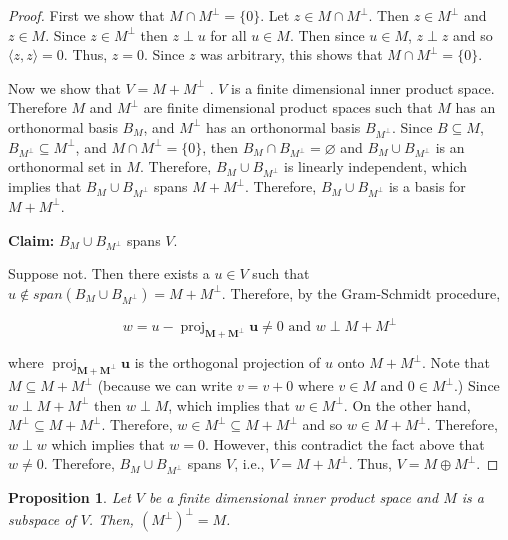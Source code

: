 \documentclass[12pt]{article}
\DeclareMathOperator{\proj}{proj}
\newcommand{\vct}{\mathbf}
\newcommand{\vctproj}[2][]{\proj_{\vct{#1}}\vct{#2}}
\newtheorem*{proposition}{Proposition}
\theoremstyle{definition}
\begin{document}
\begin{proof}
First we show that $M \cap M^{\perp} = \{ 0 \}$. Let $z \in M \cap M^{\perp}$. Then 
$z \in M^{\perp}$ and $z \in M$. Since $z \in M^{\perp}$ then $z \perp u$ for all
$u \in M$. Then since $u \in M$, $z \perp z$ and so $\langle z, z \rangle = 0$. Thus,
$z = 0$. Since $z$ was arbitrary, this shows that $M \cap M^{\perp} = \{ 0 \}$.

Now we show that $V = M + M^{\perp}$ . $V$ is a finite dimensional inner product space.
Therefore $M$ and $M^{\perp}$ are finite dimensional product spaces such that $M$ has
an orthonormal basis $B_M$, and $M^{\perp}$ has an orthonormal basis $B_{M^{\perp}}$.
Since $B \subseteq M$, $B_{M^{\perp}} \subseteq M^{\perp}$, and
$M \cap M^{\perp} = \{ 0 \}$, then $B_M \cap B_{M^{\perp}} = \varnothing$ and
$B_M \cup B_{M^{\perp}}$ is an orthonormal set in $M$. Therefore, $B_M \cup B_{M^{\perp}}$
is linearly independent, which implies that $B_M \cup B_{M^{\perp}}$ spans $M + M^{\perp}$.
Therefore, $B_M \cup B_{M^{\perp}}$ is a basis for $M + M^{\perp}$.

\textbf{Claim:} $B_M \cup B_{M^{\perp}}$ spans $V$.

Suppose not. Then there exists a $u \in V$ such that $u \notin span(B_M \cup B_{M^{\perp}}) =
M + M^{\perp}$. Therefore, by the Gram-Schmidt procedure,

\[
w = u - \vctproj[M + M^{\perp}]{u} \neq 0
\text{ and }
w \perp M + M^{\perp}\]

where $\vctproj[M + M^{\perp}]{u}$ is the orthogonal projection of $u$ onto $M + M^{\perp}$.
Note that $M \subseteq M + M^{\perp}$ (because we can write $v = v + 0$ where $v \in M$ and
$0 \in M^{\perp}$.) Since $w \perp M + M^{\perp}$ then $w \perp M$, which implies that
$w \in M^{\perp}$. On the other hand, $M^{\perp} \subseteq M + M^{\perp}$. Therefore,
$w \in M^{\perp} \subseteq M + M^{\perp}$ and so $w \in M + M^{\perp}$. Therefore,
$w \perp w$ which implies that $w = 0$. However, this contradict the fact above that
$w \neq 0$. Therefore, $B_M \cup B_{M^{\perp}}$ spans $V$, i.e., $V = M + M^{\perp}$.
Thus, $V = M \oplus M^{\perp}$.
\end{proof}

\begin{proposition}
Let $V$ be a finite dimensional inner product space and $M$ is a subspace of $V$. Then,
$(M^{\perp})^{\perp} = M$.
\end{proposition}
\end{document}
